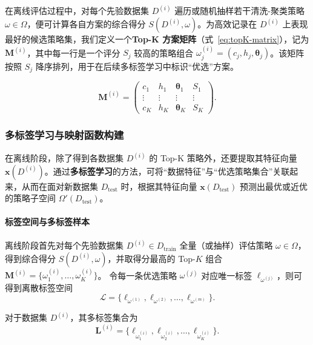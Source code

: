 \documentclass[10pt]{article} %
\numberwithin{equation}{section}
\begin{document}
在离线评估过程中，对每个先验数据集 $D^{(i)}$ 遍历或随机抽样若干清洗-聚类策略 $\omega \in \Omega$，便可计算各自方案的综合得分 $S(D^{(i)}, \omega)$。为高效记录在 $D^{(i)}$ 上表现最好的候选策略集，我们定义一个\textbf{Top-K 方案矩阵}（式~\eqref{eq:topK-matrix}），记为 $\mathbf{M}^{(i)}$，其中每一行是一个评分 $S_j$ 较高的策略组合 $\omega_j^{(i)}=(c_j,h_j,\boldsymbol{\theta}_j)$。该矩阵按照 $S_j$ 降序排列，用于在后续多标签学习中标识“优选”方案。

\begin{equation}\label{eq:topK-matrix}
\mathbf{M}^{(i)} 
= 
\begin{pmatrix}
c_1 & h_1 & \boldsymbol{\theta}_1 & S_1 \\
\vdots & \vdots & \vdots & \vdots \\
c_K & h_K & \boldsymbol{\theta}_K & S_K
\end{pmatrix}.
\end{equation}

\subsubsection{多标签学习与映射函数构建}
\label{subsec:multi-label}

在离线阶段，除了得到各数据集 $D^{(i)}$ 的 Top-K 策略外，还要提取其特征向量 $\mathbf{x}(D^{(i)})$。通过\textbf{多标签学习}的方法，可将“数据特征”与“优选策略集合”关联起来，从而在面对新数据集 $D_{\text{test}}$ 时，根据其特征向量 $\mathbf{x}(D_{\text{test}})$ 预测出最优或近优的策略子空间 $\Omega'(D_{\text{test}})$。

\paragraph{标签空间与多标签样本}
离线阶段首先对每个先验数据集
$D^{(i)}\!\in\!D_{\text{train}}$ 全量（或抽样）评估策略
$\omega\!\in\!\Omega$，得到综合得分
$S(D^{(i)},\omega)$，并取得分最高的
Top-$K$ 组合  
$\mathbf{M}^{(i)}=\{\omega_1^{(i)},\dots,\omega_K^{(i)}\}$。
令每一条优选策略 $\omega^{(j)}$ 对应唯一标签
$\ell_{\omega^{(j)}}$，则可得到离散标签空间  
\begin{equation}\label{eq:label-space}
  \mathcal{L}=\{\ell_{\omega^{(1)}},\ell_{\omega^{(2)}},\dots,\ell_{\omega^{(m)}}\}.
\end{equation}

\noindent 对于数据集 $D^{(i)}$，其多标签集合为  
\begin{equation}\label{eq:multi-label-for-D}
  \mathbf{L}^{(i)}=
  \bigl\{\ell_{\omega_1^{(i)}},\ell_{\omega_2^{(i)}},\dots,\ell_{\omega_K^{(i)}}\bigr\}.
\end{equation}
\end{document}
